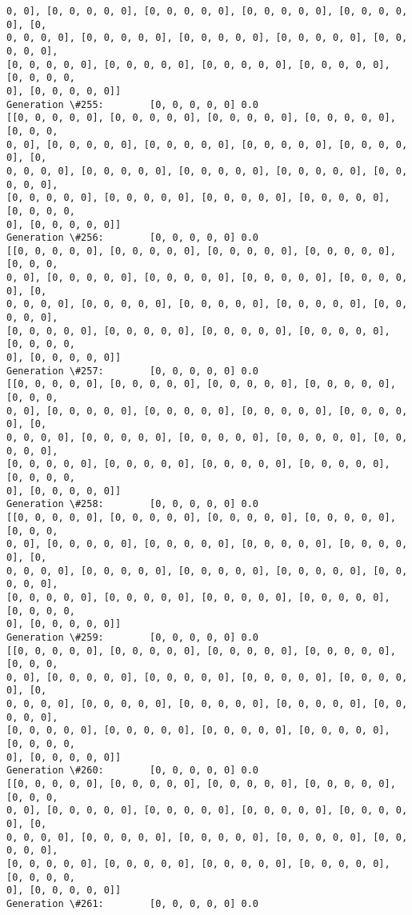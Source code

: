 \documentclass[11pt]{article}
\begin{document}
\begin{Verbatim}[commandchars=\\\{\}]
0, 0], [0, 0, 0, 0, 0], [0, 0, 0, 0, 0], [0, 0, 0, 0, 0], [0, 0, 0, 0, 0], [0,
0, 0, 0, 0], [0, 0, 0, 0, 0], [0, 0, 0, 0, 0], [0, 0, 0, 0, 0], [0, 0, 0, 0, 0],
[0, 0, 0, 0, 0], [0, 0, 0, 0, 0], [0, 0, 0, 0, 0], [0, 0, 0, 0, 0], [0, 0, 0, 0,
0], [0, 0, 0, 0, 0]]
Generation \#255:        [0, 0, 0, 0, 0] 0.0
[[0, 0, 0, 0, 0], [0, 0, 0, 0, 0], [0, 0, 0, 0, 0], [0, 0, 0, 0, 0], [0, 0, 0,
0, 0], [0, 0, 0, 0, 0], [0, 0, 0, 0, 0], [0, 0, 0, 0, 0], [0, 0, 0, 0, 0], [0,
0, 0, 0, 0], [0, 0, 0, 0, 0], [0, 0, 0, 0, 0], [0, 0, 0, 0, 0], [0, 0, 0, 0, 0],
[0, 0, 0, 0, 0], [0, 0, 0, 0, 0], [0, 0, 0, 0, 0], [0, 0, 0, 0, 0], [0, 0, 0, 0,
0], [0, 0, 0, 0, 0]]
Generation \#256:        [0, 0, 0, 0, 0] 0.0
[[0, 0, 0, 0, 0], [0, 0, 0, 0, 0], [0, 0, 0, 0, 0], [0, 0, 0, 0, 0], [0, 0, 0,
0, 0], [0, 0, 0, 0, 0], [0, 0, 0, 0, 0], [0, 0, 0, 0, 0], [0, 0, 0, 0, 0], [0,
0, 0, 0, 0], [0, 0, 0, 0, 0], [0, 0, 0, 0, 0], [0, 0, 0, 0, 0], [0, 0, 0, 0, 0],
[0, 0, 0, 0, 0], [0, 0, 0, 0, 0], [0, 0, 0, 0, 0], [0, 0, 0, 0, 0], [0, 0, 0, 0,
0], [0, 0, 0, 0, 0]]
Generation \#257:        [0, 0, 0, 0, 0] 0.0
[[0, 0, 0, 0, 0], [0, 0, 0, 0, 0], [0, 0, 0, 0, 0], [0, 0, 0, 0, 0], [0, 0, 0,
0, 0], [0, 0, 0, 0, 0], [0, 0, 0, 0, 0], [0, 0, 0, 0, 0], [0, 0, 0, 0, 0], [0,
0, 0, 0, 0], [0, 0, 0, 0, 0], [0, 0, 0, 0, 0], [0, 0, 0, 0, 0], [0, 0, 0, 0, 0],
[0, 0, 0, 0, 0], [0, 0, 0, 0, 0], [0, 0, 0, 0, 0], [0, 0, 0, 0, 0], [0, 0, 0, 0,
0], [0, 0, 0, 0, 0]]
Generation \#258:        [0, 0, 0, 0, 0] 0.0
[[0, 0, 0, 0, 0], [0, 0, 0, 0, 0], [0, 0, 0, 0, 0], [0, 0, 0, 0, 0], [0, 0, 0,
0, 0], [0, 0, 0, 0, 0], [0, 0, 0, 0, 0], [0, 0, 0, 0, 0], [0, 0, 0, 0, 0], [0,
0, 0, 0, 0], [0, 0, 0, 0, 0], [0, 0, 0, 0, 0], [0, 0, 0, 0, 0], [0, 0, 0, 0, 0],
[0, 0, 0, 0, 0], [0, 0, 0, 0, 0], [0, 0, 0, 0, 0], [0, 0, 0, 0, 0], [0, 0, 0, 0,
0], [0, 0, 0, 0, 0]]
Generation \#259:        [0, 0, 0, 0, 0] 0.0
[[0, 0, 0, 0, 0], [0, 0, 0, 0, 0], [0, 0, 0, 0, 0], [0, 0, 0, 0, 0], [0, 0, 0,
0, 0], [0, 0, 0, 0, 0], [0, 0, 0, 0, 0], [0, 0, 0, 0, 0], [0, 0, 0, 0, 0], [0,
0, 0, 0, 0], [0, 0, 0, 0, 0], [0, 0, 0, 0, 0], [0, 0, 0, 0, 0], [0, 0, 0, 0, 0],
[0, 0, 0, 0, 0], [0, 0, 0, 0, 0], [0, 0, 0, 0, 0], [0, 0, 0, 0, 0], [0, 0, 0, 0,
0], [0, 0, 0, 0, 0]]
Generation \#260:        [0, 0, 0, 0, 0] 0.0
[[0, 0, 0, 0, 0], [0, 0, 0, 0, 0], [0, 0, 0, 0, 0], [0, 0, 0, 0, 0], [0, 0, 0,
0, 0], [0, 0, 0, 0, 0], [0, 0, 0, 0, 0], [0, 0, 0, 0, 0], [0, 0, 0, 0, 0], [0,
0, 0, 0, 0], [0, 0, 0, 0, 0], [0, 0, 0, 0, 0], [0, 0, 0, 0, 0], [0, 0, 0, 0, 0],
[0, 0, 0, 0, 0], [0, 0, 0, 0, 0], [0, 0, 0, 0, 0], [0, 0, 0, 0, 0], [0, 0, 0, 0,
0], [0, 0, 0, 0, 0]]
Generation \#261:        [0, 0, 0, 0, 0] 0.0

\end{Verbatim}
\end{document}
